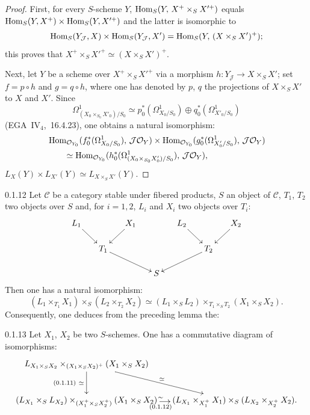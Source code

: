 \begin{proof}
{\renewcommand{\thefootnote}{(18)}}%
First, for every \(S\)-scheme \(Y\),
\(\operatorname{Hom}_{S}(Y,\,X^{+}\times_{S}X'^{+})\) equals
\(\operatorname{Hom}_{S}(Y,X^{+})\times\operatorname{Hom}_{S}(Y,X'^{+})\) and the latter is isomorphic to
\[
\operatorname{Hom}_{S}(Y_{\mathcal{J}},X)\times\operatorname{Hom}_{S}(Y_{\mathcal{J}},X')
=\operatorname{Hom}_{S}(Y,\,(X\times_{S}X')^{+});
\]
this proves that \(X^{+}\times_{S}X'^{+}\simeq(X\times_{S}X')^{+}\).

Next, let \(Y\) be a scheme over \(X^{+}\times_{S}X'^{+}\) via a morphism
\(h\colon Y_{\mathcal{J}}\to X\times_{S}X'\); set \(f=p\circ h\) and
\(g=q\circ h\), where one has denoted by \(p\), \(q\) the projections of
\(X\times_{S}X'\) to \(X\) and \(X'\). Since
\[
\Omega^{1}_{(X_{0}\times_{S_{0}}X'_{0})/S_{0}}
\simeq
p_{0}^{*}(\Omega^{1}_{X_{0}/S_{0}})\oplus q_{0}^{*}(\Omega^{1}_{X'_{0}/S_{0}})
\]
(\cf EGA~\(\mathrm{IV}_{4}\),~16.4.23), one obtains a natural isomorphism:
\begin{align*}
&\operatorname{Hom}_{\mathcal{O}_{Y_{0}}}(f_{0}^{*}(\Omega^{1}_{X_{0}/S_{0}}),\,\mathcal{J}\mathcal{O}_{Y})
\times
\operatorname{Hom}_{\mathcal{O}_{Y_{0}}}(g_{0}^{*}(\Omega^{1}_{X'_{0}/S_{0}}),\,\mathcal{J}\mathcal{O}_{Y})\\
&\qquad\simeq
\operatorname{Hom}_{\mathcal{O}_{Y_{0}}}(h_{0}^{*}(\Omega^{1}_{(X_{0}\times_{S_{0}}X'_{0})/S_{0}}),\,\mathcal{J}\mathcal{O}_{Y}),
\end{align*}
\ie \(L_{X}(Y)\times L_{X'}(Y)\simeq L_{X\times_{S}X'}(Y)\).
\end{proof}

\begin{remark}{0.1.12}
\label{III.0.1.12}
{\renewcommand{\thefootnote}{(19)}}%
Let \(\mathcal{C}\) be a category stable under fibered products, \(S\) an
object of \(\mathcal{C}\), \(T_{1}\), \(T_{2}\) two objects over \(S\) and,
for \(i=1,2\), \(L_{i}\) and \(X_{i}\) two objects over \(T_{i}\):
\[
\xymatrix@C=1.5em@R=1.6em{
L_{1}\ar[dr]
& & X_{1}\ar[dl]
& & L_{2}\ar[dr]
& & X_{2}\ar[dl]
\\
& T_{1}\ar[drr]
& & & & T_{2}\ar[dll]
\\
& & & S
}
\]
Then one has a natural isomorphism:
\[
(L_{1}\times_{T_{1}}X_{1})\times_{S}(L_{2}\times_{T_{2}}X_{2})
\simeq
(L_{1}\times_{S}L_{2})\times_{T_{1}\times_{S}T_{2}}(X_{1}\times_{S}X_{2}).
\]
Consequently, one deduces from the preceding lemma the:
\end{remark}

\begin{corollary}{0.1.13}
\label{III.0.1.13}
Let \(X_{1}\), \(X_{2}\) be two \(S\)-schemes. One has a commutative diagram
of isomorphisms:
\[
\xymatrix@C=1.2em@R=2.6em{
*+{L_{X_{1}\times_{S}X_{2}}\times_{(X_{1}\times_{S}X_{2})^{+}}(X_{1}\times_{S}X_{2})}
  \ar[d]_{(0.1.11)\ \simeq}
  \ar[dr]^{\simeq}
&
\\
*+{(L_{X_{1}}\times_{S}L_{X_{2}})\times_{(X_{1}^{+}\times_{S}X_{2}^{+})}(X_{1}\times_{S}X_{2})}
  \ar[r]^{\sim}_{(0.1.12)}
& *+{(L_{X_{1}}\times_{X_{1}^{+}}X_{1})\times_{S}(L_{X_{2}}\times_{X_{2}^{+}}X_{2}).}
}
\]
\end{corollary}

